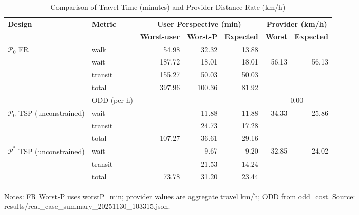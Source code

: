 \begin{table}[t]
\centering
\caption{Comparison of Travel Time (minutes) and Provider Distance Rate (km/h)}
\begin{tabular}{l l r r r r r}
\toprule
\textbf{Design} & \textbf{Metric} & 
\multicolumn{3}{c}{\textbf{User Perspective (min)}} & 
\multicolumn{2}{c}{\textbf{Provider (km/h)}} \\
\cmidrule(lr){3-5}\cmidrule(lr){6-7}
& & \textbf{Worst-user} & \textbf{Worst-P} & \textbf{Expected} & \textbf{Worst} & \textbf{Expected} \\
\midrule
$\mathcal{P}_0$ FR & walk    & 54.98 & 32.32 & 13.88 &        &        \\
                   & wait    & 187.72 & 18.01 & 18.01 & 56.13  & 56.13  \\
                   & transit & 155.27 & 50.03 & 50.03 &        &        \\
                   & total   & 397.96 & 100.36 & 81.92 &       &        \\
                   & ODD (per h) &  &  &  & \multicolumn{2}{c}{0.00} \\
\midrule
$\mathcal{P}_0$ TSP (unconstrained) & wait    &  & 11.88 & 11.88 & 34.33 & 25.86 \\
                                    & transit &  & 24.73 & 17.28 &        &       \\
                                    & total   & 107.27 & 36.61 & 29.16 &        &       \\
\midrule
$\mathcal{P}^*$ TSP (unconstrained) & wait    &  & 9.67 & 9.20 & 32.85 & 24.02 \\
                                    & transit &  & 21.53 & 14.24 &        &       \\
                                    & total   & 73.78 & 31.20 & 23.44 &        &       \\
\bottomrule
\end{tabular}

\vspace{0.5ex}
\small
Notes: FR Worst-P uses worstP\_min; provider values are aggregate travel km/h; ODD from odd\_cost. Source: results/real_case_summary_20251130_103315.json.
\end{table}